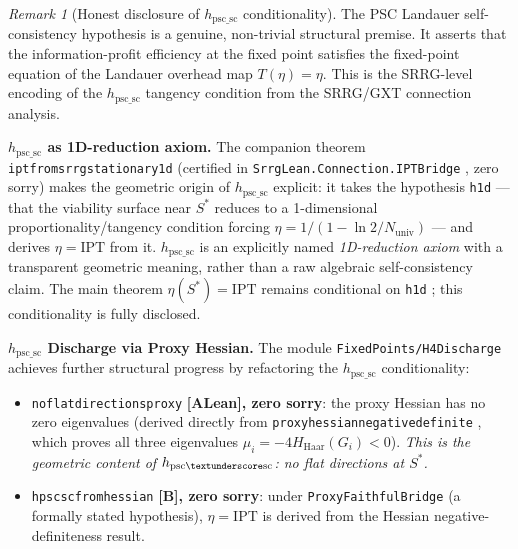 \documentclass[11pt]{article}
\theoremstyle{remark}
\newtheorem{remark}[theorem]{Remark}
\newcommand{\IPT}{\mathrm{IPT}}
\newcommand{\lean}[1]{%
  \penalty-100
  \begingroup
  \def\_{\textunderscore\allowbreak}%
  \texttt{#1}%
  \endgroup
}
\newcommand{\Sstar}{S^*}
\begin{document}
\begin{remark}[Honest disclosure of $h_{\mathrm{psc\_sc}}$ conditionality]
\label{rem:h4_disclosure}
The PSC Landauer self-consistency hypothesis is a genuine, non-trivial structural
premise. It asserts that the information-profit efficiency at the fixed point
satisfies the fixed-point equation of the Landauer overhead map $T(\eta) = \eta$.
This is the SRRG-level encoding of the $h_{\mathrm{psc\_sc}}$ tangency condition from the SRRG/GXT
connection analysis.

\textbf{$h_{\mathrm{psc\_sc}}$ as 1D-reduction axiom.}
The companion theorem \lean{ipt\_from\_srrg\_stationary\_1d} (certified in
\lean{SrrgLean.Connection.IPTBridge}, zero sorry) makes the geometric origin of $h_{\mathrm{psc\_sc}}$
explicit: it takes the hypothesis \lean{h\_1d} --- that the viability surface near
$\Sstar$ reduces to a 1-dimensional proportionality/tangency condition forcing
$\eta = 1/(1 - \ln 2 / N_{\text{univ}})$ --- and derives $\eta = \IPT$ from it.
$h_{\mathrm{psc\_sc}}$ is an explicitly named \emph{1D-reduction axiom} with a
transparent geometric meaning, rather than a raw algebraic self-consistency claim. The main theorem $\eta(\Sstar) = \IPT$ remains
conditional on \lean{h\_1d}; this conditionality is fully disclosed.

\textbf{$h_{\mathrm{psc\_sc}}$ Discharge via Proxy Hessian.}
The module \lean{FixedPoints/H4Discharge} achieves further structural
progress by refactoring the $h_{\mathrm{psc\_sc}}$ conditionality:
\begin{itemize}[leftmargin=2em]
\item \lean{no\_flat\_directions\_proxy} \textbf{[A\_Lean], zero sorry}: the proxy
  Hessian has no zero eigenvalues (derived directly from
  \lean{proxy\_hessian\_negative\_definite}, which proves all three eigenvalues
  $\mu_i = -4H_{\mathrm{Haar}}(G_i) < 0$).
  \emph{This is the geometric content of $h_{\mathrm{psc\_sc}}$: no flat directions at $\Sstar$.}
\item \lean{h\_psc\_sc\_from\_hessian} \textbf{[B], zero sorry}: under
  \lean{ProxyFaithfulBridge} (a formally stated hypothesis), $\eta = \IPT$ is
  derived from the Hessian negative-definiteness result.
\end{itemize}


\end{remark}
\end{document}
